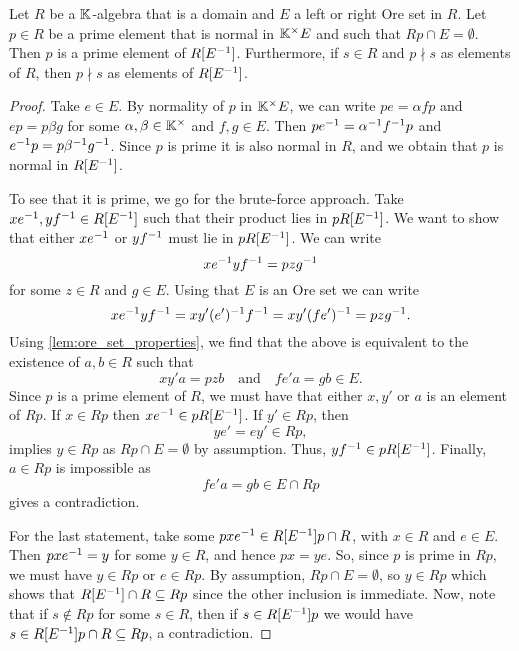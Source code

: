 \begin{lemma}\label{lem:prime_in_ore_localization}
	Let $R$ be a $\mathbb{K}$-algebra that is a domain and $E$ a left or right Ore set in $R$.
	Let $p \in R$ be a prime element that is normal in $\mathbb{K}^\times E$ and such that $Rp
		\cap E = \emptyset$. Then $p$ is a prime element of $R[E^{-1}]$. Furthermore, if $s \in
		R$ and $p \nmid s$ as elements of $R$, then $p \nmid s$ as elements of $R[E^{-1}]$.
\end{lemma}
\begin{proof}
	Take $e \in E$. By normality of $p$ in $\mathbb{K}^\times E$, we can write $pe = \alpha f p$
	and $ep = p \beta g$ for some $\alpha, \beta \in \mathbb{K}^\times$ and $f,g \in E$. Then $p
		e ^{-1} = \alpha^{-1} f^{-1} p$ and $e^{-1} p = p \beta^{-1} g ^{-1}$. Since $p$ is prime it
	is also normal in $R$, and we obtain that $p$ is normal in $R[E^{-1}]$.

	To see that it is prime, we go for the brute-force approach. Take $xe^{-1}, yf^{-1} \in
		R[E^{-1}]$ such that their product lies in $pR[E^{-1}]$. We want to show that either
	$xe^{-1}$ or $yf^{-1}$ must lie in $pR[E^{-1}]$. We can write
	\begin{equation*}
		xe^{-1} yf^{-1} = p z g^{-1}
	\end{equation*}
	for some $z \in R$ and $g \in E$. Using that $E$ is an Ore set we can write
	\begin{equation*}
		x e^{-1} y f^{-1} = x y' (e')^{-1} f^{-1} = xy' (fe')^{-1} = p z g^{-1}.
	\end{equation*}
	Using \cref{lem:ore_set_properties}, we find that the above is equivalent to the
	existence of $a,b \in R$ such that
	\begin{equation*}
		xy'a = pzb \quad \text{and} \quad fe'a = gb \in E.
	\end{equation*}
	Since $p$ is a prime element of $R$, we must have that either $x,y'$ or $a$ is an
	element of $Rp$. If $x \in Rp$ then $xe^{-1} \in pR[E^{-1}]$. If $y' \in Rp$, then
	\begin{equation*}
		ye' = ey' \in Rp,
	\end{equation*}
	implies $y \in Rp$ as $Rp \cap E = \emptyset$ by assumption. Thus, $y f^{-1} \in
		pR[E^{-1}]$. Finally, $a \in Rp$ is impossible as
	\begin{equation*}
		fe'a = gb \in E \cap Rp
	\end{equation*}
	gives a contradiction.

	For the last statement, take some $pxe^{-1} \in R[E^{-1}]p \cap R$, with $x \in R$ and $e
		\in E$. Then $pxe^{-1} = y$ for some $y \in R$, and hence $px = ye$. So, since $p$ is
	prime in $Rp$, we must have $y \in Rp$ or $e\in Rp$. By assumption, $Rp \cap E =
		\emptyset$, so $y \in Rp$ which shows that $R[E^{-1}] \cap R \subseteq Rp$ since the
	other inclusion is immediate. Now, note that if $s\notin Rp$ for some $s\in R$, then if
	$s \in R[E^{-1}]p$ we would have $s \in R[E^{-1}]p \cap R \subseteq Rp$, a contradiction.
\end{proof}


